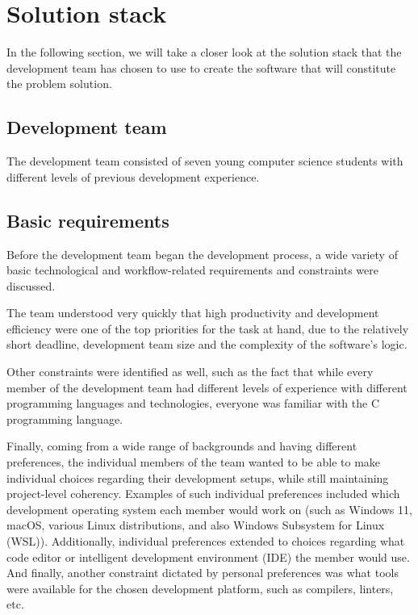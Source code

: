 \section{Solution stack}\label{sec:solution-stack}

In the following section, we will take a closer look at the solution stack that the development team has chosen to use
to create the software that will constitute the problem solution.

\subsection{Development team}\label{subsec:development-team}

The development team consisted of seven young computer science students with different levels of previous development
experience.

\subsection{Basic requirements}\label{subsec:basic-requirements}

Before the development team began the development process, a wide variety of basic technological and workflow-related
requirements and constraints were discussed.

The team understood very quickly that high productivity and development efficiency were one of the top priorities for
the task at hand, due to the relatively short deadline, development team size and the complexity of the software's
logic.

Other constraints were identified as well, such as the fact that while every member of the development team had
different levels of experience with different programming languages and technologies, everyone was familiar with the
C programming language.

Finally, coming from a wide range of backgrounds and having different preferences, the individual members of the team
wanted to be able to make individual choices regarding their development setups, while still maintaining project-level
coherency.
Examples of such individual preferences included which development operating system each member would work on (such as
Windows 11, macOS, various Linux distributions, and also Windows Subsystem for Linux (WSL)).
Additionally, individual preferences extended to choices regarding what code editor or intelligent development
environment (IDE) the member would use.
And finally, another constraint dictated by personal preferences was what tools were available for the chosen
development platform, such as compilers, linters, etc.

